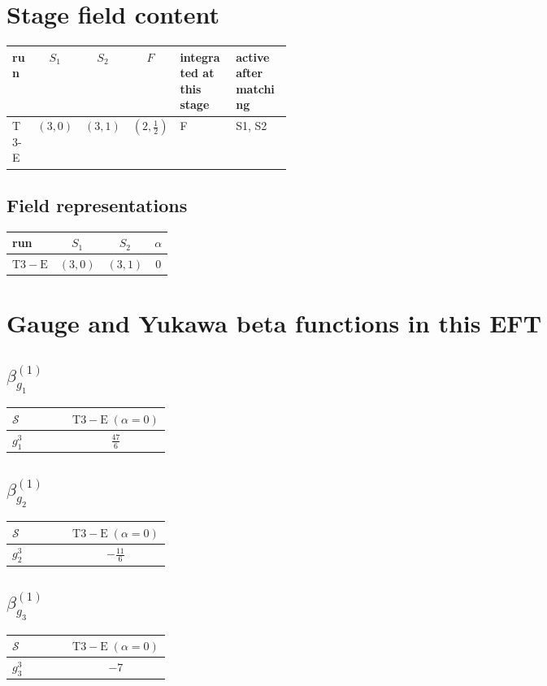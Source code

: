 \documentclass[9pt]{article}
\begin{document}
\section*{Stage field content}
\begin{longtable}{@{}lccc p{0.20\linewidth}p{0.20\linewidth}@{}}
\toprule
run & $S_1$ & $S_2$ & $F$ & integrated at this stage & active after matching \\
\midrule
T3-E & $(3,0)$ & $(3,1)$ & $(2,\frac{1}{2})$ & F & S1, S2 \\
\bottomrule
\end{longtable}
\subsection*{Field representations}
\begin{longtable}{@{}lccc@{}}
\toprule
run & $S_1$ & $S_2$ & $\alpha$ \\
\midrule
$\mathrm{T3-E}$ & $(3,0)$ & $(3,1)$ & $0$ \\
\bottomrule
\end{longtable}
\section*{Gauge and Yukawa beta functions in this EFT}
\subsection*{$ \beta_{g_1}^{(1)} $}
\begin{longtable}{@{}p{0.38\linewidth}c@{}}
\toprule
$\mathcal{S}$ & $ \mathrm{T3-E}\;(\alpha=0) $ \\
\midrule
$ g_1^3 $ & $ \frac{47}{6} $ \\
\bottomrule
\end{longtable}
\subsection*{$ \beta_{g_2}^{(1)} $}
\begin{longtable}{@{}p{0.38\linewidth}c@{}}
\toprule
$\mathcal{S}$ & $ \mathrm{T3-E}\;(\alpha=0) $ \\
\midrule
$ g_2^3 $ & $ - \frac{11}{6} $ \\
\bottomrule
\end{longtable}
\subsection*{$ \beta_{g_3}^{(1)} $}
\begin{longtable}{@{}p{0.38\linewidth}c@{}}
\toprule
$\mathcal{S}$ & $ \mathrm{T3-E}\;(\alpha=0) $ \\
\midrule
$ g_3^3 $ & $ -7 $ \\
\bottomrule
\end{longtable}
\end{document}

